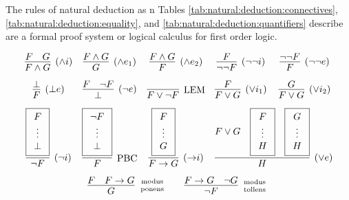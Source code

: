 
\begin{definition}\label{def:natural:deduction}
	The rules of {\myem natural deduction} as n Tables 
	\ref{tab:natural:deduction:connectives}, \ref{tab:natural:deduction:equality}, 
	and \ref{tab:natural:deduction:quantifiers} describe are a formal proof system or logical calculus for first order logic.

\begin{table}[hbt]
\begin{gather*}
\begin{array}{ccccc}
\infer[(\land i)]{F\land G}{F & G} 
&
\infer[(\land e_1)]{G}{F \land G} 
&
\infer[(\land e_2)]{F}{F \land G}
&
\infer[(\lnot\lnot i)]{\lnot\lnot F}{F} 
&
\infer[(\lnot\lnot e)]{F}{\lnot\lnot F}
\\[0.7em]
\infer[(\bot e)]{F}{\bot}
&
\infer[(\lnot e)]{\bot}{F & \lnot F}
&
\infer[\text{LEM}]{F\lor\lnot F}{}
&
\infer[(\lor i_1)]{F\lor G}{F}
&
\infer[(\lor i_2)]{F\lor G}{G}
\\[0.7em]
\infer[(\lnot i)]{\lnot F}{
	\boxed{\begin{array}{c}F\\\vdots\\\bot\end{array}}}
&
\infer[\text{PBC}]{F}{
	\boxed{\begin{array}{c}\lnot F\\\vdots\\\bot\end{array}}}
&
\infer[({\limp} i)]{F\limp G}{
	\boxed{\begin{array}{c}F\\\vdots\\G\end{array}
}}
&
\multicolumn{2}{l}{
	\infer[(\lor e)]{H}{
		F\lor G &
		\boxed{\begin{array}{c}F\\\vdots\\H\end{array}} &
		\boxed{\begin{array}{c}G\\\vdots\\H\end{array}}
	}	
}
\\[0.7em]
&
\multicolumn{3}{r}{
\infer[\text{modus}\atop\text{ponens}]{G}{F & F\limp G}
\qquad
\infer[\text{modus}\atop\text{tollens}]{\lnot F}{F\limp G & \lnot G}
}
&
\end{array}

\end{gather*}
\end{table}
\end{definition}
